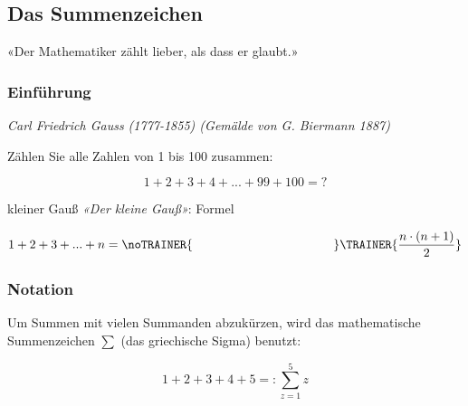%
%

\subsection{Das Summenzeichen}\label{Summenzeichen}
«Der Mathematiker zählt lieber, als dass er glaubt.»
\vspace{4mm}



\newpage


\subsubsection{Einführung}

\begin{center}\textit{Carl Friedrich Gauss (1777-1855) (Gemälde von G. Biermann
    1887)}\end{center}

Zählen Sie alle Zahlen von 1 bis 100 zusammen:

$$1+2+3+4+...+99+100 = ?$$


\begin{gesetz}{kleiner Gauß}{}
\textit{«Der kleine Gauß»}: Formel

$$1+2+3+...+n = \noTRAINER{\hspace{4cm}}\TRAINER{\frac{n\cdot{}(n+1)}2}$$
\end{gesetz}

\newpage

\subsubsection{Notation}
Um Summen mit vielen Summanden abzukürzen, wird das mathematische
Summenzeichen  $\sum{}$ (das griechische Sigma) benutzt:

\begin{definition}{}{}
  $$1 + 2 + 3 + 4 + 5 =: \sum_{z=1}^{5}{z}$$
\end{definition}


